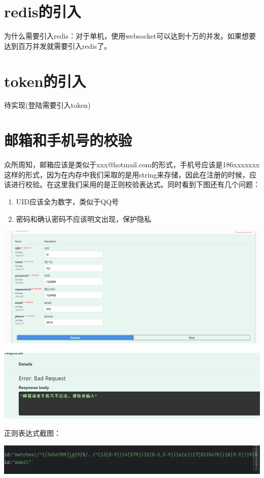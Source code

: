 \documentclass[12pt]{article}
\begin{document}
	\section{redis的引入}
	为什么需要引入redis：对于单机，使用websocket可以达到十万的并发。如果想要达到百万并发就需要引入redis了。
	\section{token的引入}
	待实现(登陆需要引入token)
	\section{邮箱和手机号的校验}
	众所周知，邮箱应该是类似于xxx@hotmail.com的形式，手机号应该是186xxxxxxx这样的形式，因为在内存中我们采取的是用string来存储，因此在注册的时候，应该进行校验。在这里我们采用的是正则校验表达式。同时看到下图还有几个问题：
	\begin{enumerate}
		\item UID应该全为数字，类似于QQ号
		\item 密码和确认密码不应该明文出现，保护隐私
	\end{enumerate}
	
	\includegraphics{16.png}
	
	\includegraphics{17.png}
	
	正则表达式截图：
	
	\includegraphics{18.png}
	
\end{document}
